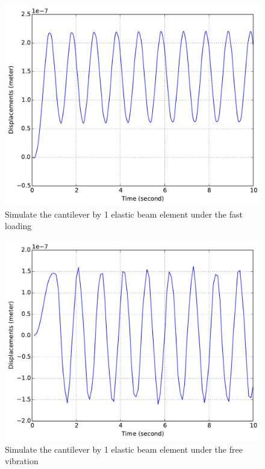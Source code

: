 \begin{figure}[!htb]
  \centering
  \includegraphics[width=12cm]{./Figure-files/_Chapter_Appendix_Illustrative_Examples/beam-5element-fastLoading.pdf}
  \caption{Simulate the cantilever by 1 elastic beam element under the fast loading}
  \label{fig_beam5_fast}
\end{figure}

\begin{figure}[!htb]
  \centering
  \includegraphics[width=12cm]{./Figure-files/_Chapter_Appendix_Illustrative_Examples/beam-5element-freeVibration.pdf}
  \caption{Simulate the cantilever by 1 elastic beam element under the free vibration}
  \label{fig_beam5_freevibration}
\end{figure}


























